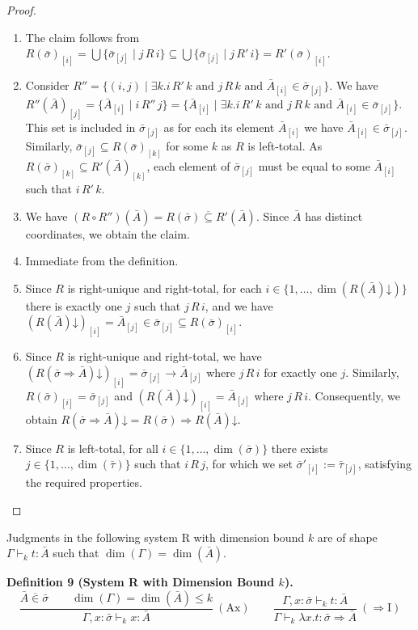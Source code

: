 \documentclass[10pt,a4paper]{article}
\newcommand{\Av}{\bar A}\newcommand{\Bv}{\bar B}\newcommand{\Cv}{\bar C}
\newcommand{\sv}{\bar\sigma}\newcommand{\tv}{\bar\tau}
\newcommand{\vsub}{\mathrel{\overline{\subseteq}}}
\newcommand{\vin}{\mathrel{\overline{\in}}}
\newcommand{\dimn}{\operatorname{dim}}
\newcommand{\pmjudgment}[3]{#1\vdash_k #2:#3}
\newcommand{\orig}[2]{\par\medskip\noindent\textbf{#1 #2.}\ }
\begin{document}
\begin{proof}
\begin{enumerate}
\item The claim follows from $R(\sv)_{[i]}=\bigcup\{\sv_{[j]}\mid j\,R\,i\}\subseteq\bigcup\{\sv_{[j]}\mid j\,R'\,i\}=R'(\sv)_{[i]}$.
\item Consider $R''=\{(i,j)\mid\exists k.i\,R'\,k\text{ and }j\,R\,k\text{ and }\Av_{[i]}\in\sv_{[j]}\}$. We have $R''(\Av)_{[j]}=\{\Av_{[i]}\mid i\,R''\,j\}=\{\Av_{[i]}\mid\exists k.i\,R'\,k\text{ and }j\,R\,k\text{ and }\Av_{[i]}\in\sv_{[j]}\}$. This set is included in $\sv_{[j]}$ as for each its element $\Av_{[i]}$ we have $\Av_{[i]}\in\sv_{[j]}$. Similarly, $\sv_{[j]}\subseteq R(\sv)_{[k]}$ for some $k$ as $R$ is left-total. As $R(\sv)_{[k]}\subseteq R'(\Av)_{[k]}$, each element of $\sv_{[j]}$ must be equal to some $\Av_{[i]}$ such that $i\,R'\,k$.
\item We have $(R\circ R'')(\Av)=R(\sv)\vsub R'(\Av)$. Since $\Av$ has distinct coordinates, we obtain the claim.
\item Immediate from the definition.
\item Since $R$ is right-unique and right-total, for each $i\in\{1,\ldots,\dimn(R(\Av)\mathord\downarrow)\}$ there is exactly one $j$ such that $j\,R\,i$, and we have $(R(\Av)\mathord\downarrow)_{[i]}=\Av_{[j]}\in\sv_{[j]}\subseteq R(\sv)_{[i]}$.
\item Since $R$ is right-unique and right-total, we have $(R(\sv\Rightarrow\Av)\mathord\downarrow)_{[i]}=\sv_{[j]}\to\Av_{[j]}$ where $j\,R\,i$ for exactly one $j$. Similarly, $R(\sv)_{[i]}=\sv_{[j]}$ and $(R(\Av)\mathord\downarrow)_{[i]}=\Av_{[j]}$ where $j\,R\,i$. Consequently, we obtain $R(\sv\Rightarrow\Av)\mathord\downarrow=R(\sv)\Rightarrow R(\Av)\mathord\downarrow$.
\item Since $R$ is left-total, for all $i\in\{1,\ldots,\dimn(\sv)\}$ there exists $j\in\{1,\ldots,\dimn(\tv)\}$ such that $i\,R\,j$, for which we set $\sv'_{[i]}:=\tv_{[j]}$, satisfying the required properties.
\end{enumerate}
\end{proof}
Judgments in the following system R with dimension bound $k$ are of shape $\pmjudgment\Gamma t\Av$ such that $\dimn(\Gamma)=\dimn(\Av)$.
\orig{Definition}{9 (System R with Dimension Bound $k$)}
\[\frac{\Av\vin\sv\qquad\dimn(\Gamma)=\dimn(\Av)\leq k}{\pmjudgment{\Gamma,x:\sv}{x}{\Av}}\ (\mathrm{Ax})\qquad
\frac{\pmjudgment{\Gamma,x:\sv}{t}{\Av}}{\pmjudgment\Gamma{\lambda x.t}{\sv\Rightarrow\Av}}\ (\Rightarrow\mathrm I)\]
\end{document}
